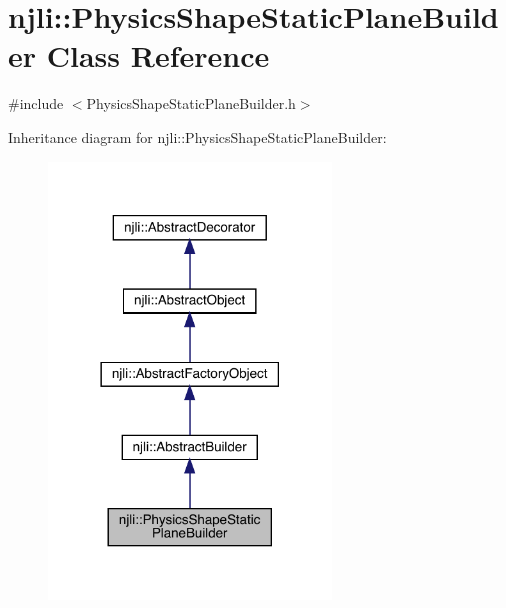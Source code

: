 \hypertarget{classnjli_1_1_physics_shape_static_plane_builder}{}\section{njli\+:\+:Physics\+Shape\+Static\+Plane\+Builder Class Reference}
\label{classnjli_1_1_physics_shape_static_plane_builder}


{\ttfamily \#include $<$Physics\+Shape\+Static\+Plane\+Builder.\+h$>$}



Inheritance diagram for njli\+:\+:Physics\+Shape\+Static\+Plane\+Builder\+:\nopagebreak
\begin{figure}[H]
\begin{center}
\leavevmode
\includegraphics[width=213pt]{classnjli_1_1_physics_shape_static_plane_builder__inherit__graph}
\end{center}
\end{figure}



